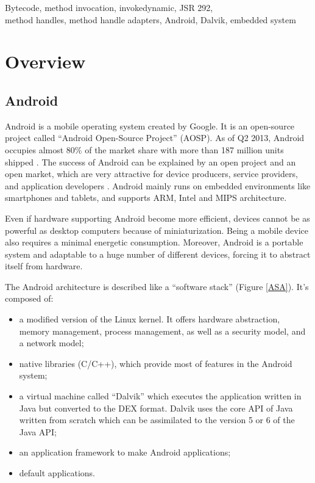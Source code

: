 \documentclass{sig-alternate}
\def \DALVIK{Dalvik\xspace}
\def \ANDROID{Android\xspace}
\def \DEX{DEX\xspace}
\begin{document}


\keywords
Bytecode, method invocation, invokedynamic, JSR 292,\\
method handles, method handle adapters, \ANDROID, Dalvik, embedded system

\newpage
\section{Overview}

  \subsection{\ANDROID}

    \ANDROID is a mobile operating system created by Google.
    It is an open-source project called ``\ANDROID Open-Source Project'' (AOSP).
    As of Q2 2013, \ANDROID occupies almost 80\% of the market share with more than 187 million units shipped \cite{idc-website}.
    The success of \ANDROID can be explained by an open project and an open market,
    which are very attractive for device producers, service providers, and application developers \cite{ieee-butler-android-landscape}\cite{ieee-paulson-shift-dynamic-languages}.
    \ANDROID mainly runs on embedded environments like smartphones and tablets,
    and supports ARM, Intel and MIPS architecture.
    
    Even if hardware supporting \ANDROID become more efficient,
    devices cannot be as powerful as desktop computers because of miniaturization.
    Being a mobile device also requires a minimal energetic consumption.
    Moreover, \ANDROID is a portable system and adaptable to a huge number of different devices,
    forcing it to abstract itself from hardware.

    The \ANDROID architecture is described like a ``software stack'' (Figure \ref{ASA}).
    It's composed of:
    \begin{itemize}
      \item a modified version of the Linux kernel.
        It offers hardware abstraction, memory management, process management, as well as a security model, and a network model;
      \item native libraries (C/C++),
        which provide most of features in the \ANDROID system;
      \item a virtual machine called ``\DALVIK''
        which executes the application written in Java but converted to the \DEX format.
        \DALVIK uses the core API of Java written from scratch
        which can be assimilated to the version 5 or 6 of the Java API;
      \item an application framework to make \ANDROID applications;
      \item default applications.
    \end{itemize}
\end{document}
